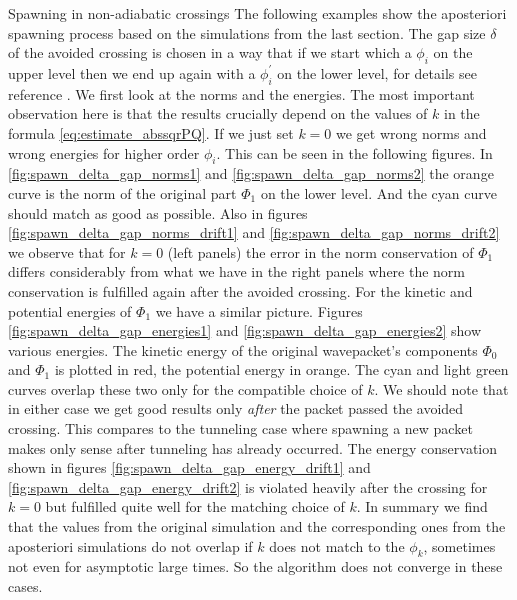 \begin{chapter}{Spawning in non-adiabatic crossings}
The following examples show the aposteriori spawning process based on the simulations
from the last section. The gap size $\delta$ of the avoided crossing is chosen in
a way that if we start which a $\phi_i$ on the upper level then we end up again
with a $\phi^\prime_i$ on the lower level, for details see reference \cite{BGH_natac}.
We first look at the norms and the energies. The most important observation here is that
the results crucially depend on the values of $k$ in the formula \eqref{eq:estimate_abssqrPQ}.
If we just set $k=0$ we get wrong norms and wrong energies for higher order
$\phi_i$. This can be seen in the following figures. In \ref{fig:spawn_delta_gap_norms1}
and \ref{fig:spawn_delta_gap_norms2} the orange curve is the norm of the original
part $\Phi_1$ on the lower level. And the cyan curve should match as good as possible.
Also in figures \ref{fig:spawn_delta_gap_norms_drift1} and \ref{fig:spawn_delta_gap_norms_drift2}
we observe that for $k=0$ (left panels) the error in the norm conservation of
$\Phi_1$ differs considerably from what we have in the right panels where
the norm conservation is fulfilled again after the avoided crossing.
For the kinetic and potential energies of $\Phi_1$ we have a similar picture.
Figures \ref{fig:spawn_delta_gap_energies1} and \ref{fig:spawn_delta_gap_energies2}
show various energies. The kinetic energy of the original wavepacket's components
$\Phi_0$ and $\Phi_1$ is plotted in red, the potential energy in orange. The cyan
and light green curves overlap these two only for the compatible choice of $k$.
We should note that in either case we get good results only \emph{after} the
packet passed the avoided crossing. This compares to the tunneling case where
spawning a new packet makes only sense after tunneling has already occurred.
The energy conservation shown in figures \ref{fig:spawn_delta_gap_energy_drift1}
and \ref{fig:spawn_delta_gap_energy_drift2} is violated heavily after the crossing
for $k=0$ but fulfilled quite well for the matching choice of $k$.
In summary we find that the values from the original simulation and the
corresponding ones from the aposteriori simulations do not overlap if $k$
does not match to the $\phi_k$, sometimes not even for asymptotic large
times. So the algorithm does not converge in these cases.



\end{chapter}
